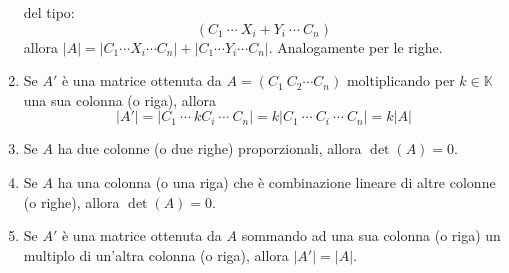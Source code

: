 \documentclass{article}
\begin{document}
\begin{enumerate}
          del tipo:
          \[
              (C_1\ \cdots\ X_i + Y_i\ \cdots\ C_n)
          \]
          allora $|A|=|C_1 \cdots X_i \cdots C_n|+|C_1\cdots Y_i\cdots C_n|$.
          Analogamente per le righe.
    \item Se $A'$ è una matrice ottenuta da $A= (C_1 \ C_2 \cdots C_n)$ moltiplicando per
          $k\in\mathbb K$ una sua colonna (o riga), allora
          \[
              |A'|=|C_1\ \cdots\ kC_i\ \cdots\ C_n|=k|C_1\ \cdots\ C_i\ \cdots\ C_n|=k|A|
          \]
    \item Se $A$ ha due colonne (o due righe) proporzionali, allora $\det(A) = 0$.
    \item Se $A$ ha una colonna (o una riga) che è combinazione lineare di altre colonne
          (o righe), allora $\det(A) = 0$.
    \item Se $A'$ è una matrice ottenuta da $A$ sommando ad una sua colonna (o riga) un
          multiplo di un'altra colonna (o riga), allora $|A'| = |A|$.
\end{enumerate}
\end{document}
